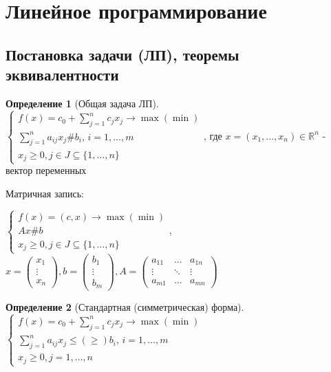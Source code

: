 \documentclass[a4paper]{article}
\theoremstyle{definition}
\newtheorem*{definition}{Определение}
\theoremstyle{remark}
\begin{document}
\section{Линейное программирование}
\subsection{Постановка задачи (ЛП), теоремы эквивалентности}
\begin{definition}[Общая задача ЛП]
$    \begin{cases}
        f(x) = c_0 + \sum_{j = 1}^n c_j x_j \to \max (\min) \\ 
        \sum_{j = 1}^{n} a_{ij}x_j \# b_i, \, i = 1, \dots, m \\
        x_j \geq 0, j \in J\subseteq \{1, \dots, n\}
    \end{cases}$, где \(x = (x_1, ..., x_n)\in \mathbb{R}^n\) -  вектор переменных

    Матричная запись:

    $\begin{cases}
        f(x) = (c, x) \to \max(\min)\\
        Ax \# b \\
        x_j \geq 0, j \in J\subseteq \{1, \dots, n\}
    \end{cases}$, $x = \begin{pmatrix}
        x_1 \\ \vdots \\ x_n
        \end{pmatrix}, b = \begin{pmatrix}
            b_1 \\ \vdots \\ b_m
            \end{pmatrix}, 
            A = \begin{pmatrix} 
                a_{11} & \dots  & a_{1n}\\
    \vdots & \ddots & \vdots\\
    a_{m1} & \dots  & a_{mn} 
    \end{pmatrix}$
\end{definition}
\begin{definition}[Стандартная (симметрическая) форма]
    $\begin{cases}
        f(x) = c_0 + \sum_{j = 1}^n c_j x_j \to \max (\min) \\
        \sum_{j = 1}^{n} a_{ij}x_j \leq (\geq) b_i, \, i = 1, \dots, m \\ 
        x_j \geq 0, j = 1, \dots, n
    \end{cases}$
\end{definition}
\end{document}
